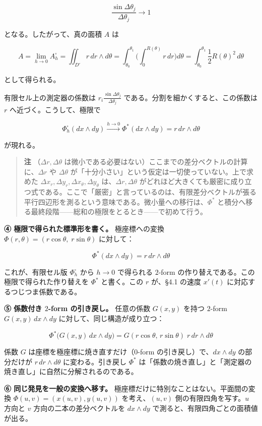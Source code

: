 \documentclass[a4paper,12pt,openany]{book}
\begin{document}
\[
\frac{\sin\Delta\theta_j}{\Delta\theta_j}\to 1
\]

となる。したがって、真の面積 \(A\) は

\[
A
=
\lim_{h\to0} A_h^\square
=
\iint_{D'} r\,dr\wedge d\theta
=
\int_{\theta_0}^{\theta_1}
\biggl(
  \int_0^{R(\theta)} r\,dr
\biggr)
d\theta
=
\int_{\theta_0}^{\theta_1}
\frac{1}{2}R(\theta)^2\,d\theta
\]

として得られる。

有限セル上の測定器の係数は
\(r_i\frac{\sin\Delta\theta_j}{\Delta\theta_j}\)
である。分割を細かくすると、この係数は \(r\) へ近づく。こうして、極限で

\[
\Phi_h^\square(dx\wedge dy)
\xrightarrow{h\to0}
\Phi^*(dx\wedge dy)
=
r\,dr\wedge d\theta
\]

が現れる。

\begin{quote}
\textbf{注} （\(\Delta r,\Delta\theta\)
は微小である必要はない）ここまでの差分ベクトルの計算に、\(\Delta r\) や
\(\Delta\theta\)
が「十分小さい」という仮定は一切使っていない。上で求めた
\(\Delta x_r, \Delta y_r, \Delta x_\theta, \Delta y_\theta\)
は、\(\Delta r,\Delta\theta\)
がどれほど大きくても厳密に成り立つ式である。ここで「厳密」と言っているのは、有限差分ベクトルが張る平行四辺形を測るという意味である。微小量への移行は、\(\Phi^*\)
と積分へ移る最終段階——総和の極限をとるとき——で初めて行う。
\end{quote}

\textbf{④ 極限で得られた標準形を書く。} 極座標への変換
\(\Phi(r,\theta) = (r\cos\theta,\; r\sin\theta)\) に対して：

\[\Phi^*(dx \wedge dy) = r\,dr \wedge d\theta\]

これが、有限セル版 \(\Phi_h^\square\) から \(h\to0\) で得られる
\(2\)-form の作り替えである。この極限で得られた作り替えを \(\Phi^*\)
と書く。この \(r\) が、§4.1 の速度 \(x'(t)\)
に対応するつじつま係数である。

\textbf{⑤ 係数付き $2$-form の引き戻し。} 任意の係数 \(G(x,y)\) を持つ
\(2\)-form \(G(x,y)\,dx \wedge dy\) に対して、同じ構造が成り立つ：

\[\Phi^*\bigl(G(x,y)\,dx \wedge dy\bigr) = G(r\cos\theta,\, r\sin\theta)\; r\,dr \wedge d\theta\]

係数 \(G\) は座標を極座標に焼き直すだけ（\(0\)-form
の引き戻し）で、\(dx \wedge dy\) の部分だけが \(r\,dr \wedge d\theta\)
に変わる。引き戻し \(\Phi^*\)
は「係数の焼き直し」と「測定器の焼き直し」に自然に分解されるのである。

\textbf{⑥ 同じ発見を一般の変換へ移す。}
極座標だけに特別なことはない。平面間の変換 \(\Phi(u,v)=(x(u,v),y(u,v))\)
を考え、\((u,v)\) 側の有限四角を写す。\(u\) 方向と \(v\)
方向の二本の差分ベクトルを \(dx\wedge dy\)
で測ると、有限四角ごとの面積値が出る。
\end{document}
